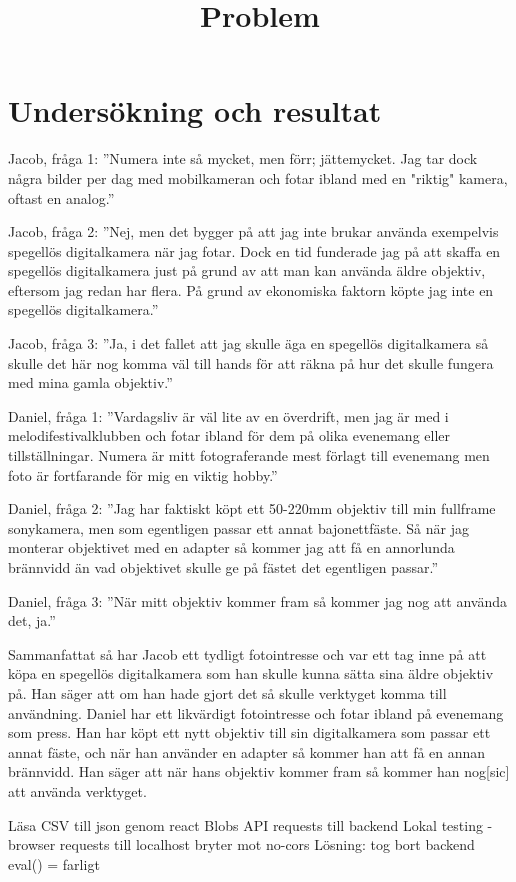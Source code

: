 \documentclass[11pt]{article}
\begin{document}
\section{Undersökning och resultat}
Jacob, fråga 1: ”Numera inte så mycket, men förr; jättemycket. Jag tar dock några bilder per dag med mobilkameran och fotar ibland med en "riktig" kamera, oftast en analog.” \par
Jacob, fråga 2: ”Nej, men det bygger på att jag inte brukar använda exempelvis spegellös digitalkamera när jag fotar. Dock en tid funderade jag på att skaffa en spegellös digitalkamera just på grund av att man kan använda äldre objektiv, eftersom jag redan har flera. På grund av ekonomiska faktorn köpte jag inte en spegellös digitalkamera.” \par
Jacob, fråga 3: ”Ja, i det fallet att jag skulle äga en spegellös digitalkamera så skulle det här nog komma väl till hands för att räkna på hur det skulle fungera med mina gamla objektiv.” \par
Daniel, fråga 1: ”Vardagsliv är väl lite av en överdrift, men jag är med i melodifestivalklubben och fotar ibland för dem på olika evenemang eller tillställningar. Numera är mitt fotograferande mest förlagt till evenemang men foto är fortfarande för mig en viktig hobby.” \par
Daniel, fråga 2: ”Jag har faktiskt köpt ett 50-220mm objektiv till min fullframe sonykamera, men som egentligen passar ett annat bajonettfäste. Så när jag monterar objektivet med en adapter så kommer jag att få en annorlunda brännvidd än vad objektivet skulle ge på fästet det egentligen passar.” \par
Daniel, fråga 3: ”När mitt objektiv kommer fram så kommer jag nog att använda det, ja.” \par
\bigskip
Sammanfattat så har Jacob ett tydligt fotointresse och var ett tag inne på att köpa en spegellös digitalkamera som han skulle kunna sätta sina äldre objektiv på. Han säger att om han hade gjort det så skulle verktyget komma till användning. Daniel har ett likvärdigt fotointresse och fotar ibland på evenemang som press. Han har köpt ett nytt objektiv till sin digitalkamera som passar ett annat fäste, och när han använder en adapter så kommer han att få en annan brännvidd. Han säger att när hans objektiv kommer fram så kommer han nog[sic] att använda verktyget. \par

\bigskip
\bigskip
\bigskip
\bigskip
\title{Problem}
\begin{outline}
    \1 Läsa CSV till json genom react
        \2 Blobs
    \1 API requests till backend
        \2 Lokal testing - browser requests till localhost bryter mot no-cors
        \2 Lösning: tog bort backend
    \1 eval() = farligt
\end{outline}
\end{document}
